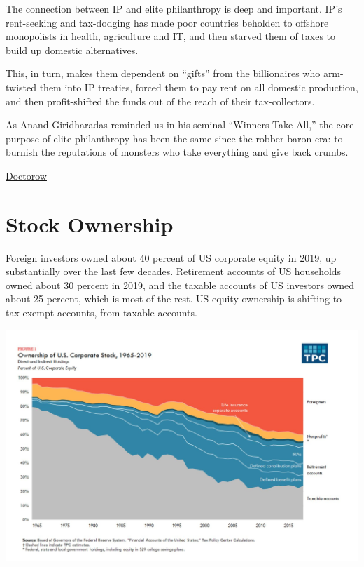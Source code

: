 \documentclass[
]{book}
\begin{document}
The connection between IP and elite philanthropy is deep and important. IP's rent-seeking and tax-dodging has made poor countries beholden to offshore monopolists in health, agriculture and IT, and then starved them of taxes to build up domestic alternatives.

This, in turn, makes them dependent on ``gifts'' from the billionaires who arm-twisted them into IP treaties, forced them to pay rent on all domestic production, and then profit-shifted the funds out of the reach of their tax-collectors.

As Anand Giridharadas reminded us in his seminal ``Winners Take All,'' the core purpose of elite philanthropy has been the same since the robber-baron era: to burnish the reputations of monsters who take everything and give back crumbs.

\href{https://pluralistic.net/2021/04/13/public-interest-pharma/\#gates-foundation}{Doctorow}

\hypertarget{stock-ownership}{%
\chapter{Stock Ownership}\label{stock-ownership}}

Foreign investors owned about 40 percent of US corporate equity in 2019, up substantially over the last few decades. Retirement accounts of US households owned about 30 percent in 2019, and the taxable accounts of US investors owned about 25 percent, which is most of the rest.
US equity ownership is shifting to tax-exempt accounts, from taxable accounts.

\includegraphics{fig/Ownership_1965-2019_US_Corp_Stock.jpeg}
\end{document}
